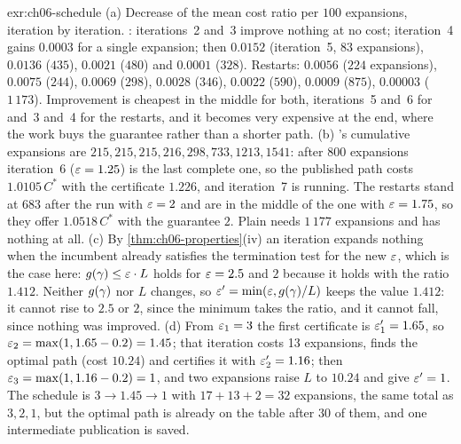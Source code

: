 \begin{solution}{exr:ch06-schedule}
(a) Decrease of the mean cost ratio per $100$ expansions, iteration by iteration. \arastar: iterations~2 and~3 improve nothing at no cost; iteration~4 gains $0.0003$ for a single expansion; then $0.0152$ (iteration~5, $83$ expansions), $0.0136$ ($435$), $0.0021$ ($480$) and $0.0001$ ($328$). Restarts: $0.0056$ ($224$ expansions), $0.0075$ ($244$), $0.0069$ ($298$), $0.0028$ ($346$), $0.0022$ ($590$), $0.0009$ ($875$), $0.00003$ ($1\,173$). Improvement is cheapest in the middle for both, iterations~5 and~6 for \arastar and~3 and~4 for the restarts, and it becomes very expensive at the end, where the work buys the guarantee rather than a shorter path. (b) \arastar's cumulative expansions are $215, 215, 215, 216, 298, 733, 1213, 1541$: after $800$ expansions iteration~6 ($\varepsilon = 1.25$) is the last complete one, so the published path costs $1.0105\,C^*$ with the certificate $1.226$, and iteration~7 is running. The restarts stand at $683$ after the run with $\varepsilon = 2$ and are in the middle of the one with $\varepsilon = 1.75$, so they offer $1.0518\,C^*$ with the guarantee $2$. Plain \astar needs $1\,177$ expansions and has nothing at all. (c) By \cref{thm:ch06-properties}(iv) an iteration expands nothing when the incumbent already satisfies the termination test for the new $\varepsilon$, which is the case here: $g(\gamma) \le \varepsilon \cdot L$ holds for $\varepsilon = 2.5$ and $2$ because it holds with the ratio $1.412$. Neither $g(\gamma)$ nor $L$ changes, so $\varepsilon' = \min(\varepsilon, g(\gamma)/L)$ keeps the value $1.412$: it cannot rise to $2.5$ or $2$, since the minimum takes the ratio, and it cannot fall, since nothing was improved. (d) From $\varepsilon_1 = 3$ the first certificate is $\varepsilon'_1 = 1.65$, so $\varepsilon_2 = \max(1, 1.65 - 0.2) = 1.45$; that iteration costs 13 expansions, finds the optimal path (cost $10.24$) and certifies it with $\varepsilon'_2 = 1.16$; then $\varepsilon_3 = \max(1, 1.16 - 0.2) = 1$, and two expansions raise $L$ to $10.24$ and give $\varepsilon' = 1$. The schedule is $3 \to 1.45 \to 1$ with $17 + 13 + 2 = 32$ expansions, the same total as $3, 2, 1$, but the optimal path is already on the table after $30$ of them, and one intermediate publication is saved.
\end{solution}

